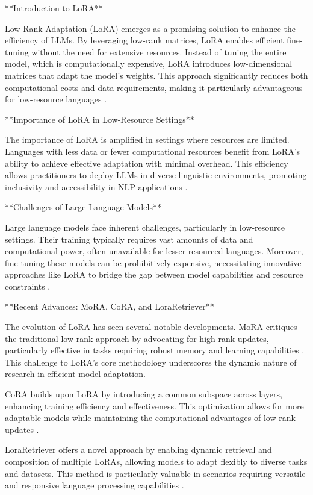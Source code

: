 \documentclass[conference]{IEEEtran}
\begin{document}
**Introduction to LoRA**

Low-Rank Adaptation (LoRA) emerges as a promising solution to enhance the efficiency of LLMs. By leveraging low-rank matrices, LoRA enables efficient fine-tuning without the need for extensive resources. Instead of tuning the entire model, which is computationally expensive, LoRA introduces low-dimensional matrices that adapt the model's weights. This approach significantly reduces both computational costs and data requirements, making it particularly advantageous for low-resource languages \cite{b1}.

**Importance of LoRA in Low-Resource Settings**

The importance of LoRA is amplified in settings where resources are limited. Languages with less data or fewer computational resources benefit from LoRA's ability to achieve effective adaptation with minimal overhead. This efficiency allows practitioners to deploy LLMs in diverse linguistic environments, promoting inclusivity and accessibility in NLP applications \cite{b2}.

**Challenges of Large Language Models**

Large language models face inherent challenges, particularly in low-resource settings. Their training typically requires vast amounts of data and computational power, often unavailable for lesser-resourced languages. Moreover, fine-tuning these models can be prohibitively expensive, necessitating innovative approaches like LoRA to bridge the gap between model capabilities and resource constraints \cite{b3}.

**Recent Advances: MoRA, CoRA, and LoraRetriever**

The evolution of LoRA has seen several notable developments. MoRA critiques the traditional low-rank approach by advocating for high-rank updates, particularly effective in tasks requiring robust memory and learning capabilities \cite{b4}. This challenge to LoRA's core methodology underscores the dynamic nature of research in efficient model adaptation.

CoRA builds upon LoRA by introducing a common subspace across layers, enhancing training efficiency and effectiveness. This optimization allows for more adaptable models while maintaining the computational advantages of low-rank updates \cite{b5}.

LoraRetriever offers a novel approach by enabling dynamic retrieval and composition of multiple LoRAs, allowing models to adapt flexibly to diverse tasks and datasets. This method is particularly valuable in scenarios requiring versatile and responsive language processing capabilities \cite{b6}.
\end{document}
